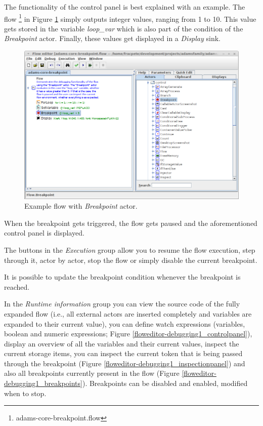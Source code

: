 The functionality of the control panel is best explained with an example. The
flow \footnote{adams-core-breakpoint.flow} in
Figure \ref{floweditor-debugging1_flow} simply outputs integer values, ranging
from 1 to 10. This value gets stored in the variable \textit{loop\_var} which is
also part of the condition of the \textit{Breakpoint} actor. Finally, these
values get displayed in a \textit{Display} sink.
\begin{figure}[htb] 
  \centering
  \includegraphics[width=12.0cm]{images/floweditor-debugging1_flow.png}
  \caption{Example flow with \textit{Breakpoint} actor.}
  \label{floweditor-debugging1_flow}
\end{figure}

When the breakpoint gets triggered, the flow gets paused and the aforementioned
control panel is displayed.
\begin{tight_itemize}
	\item The buttons in the \textit{Execution} group allow you to
	resume the flow execution, step through it, actor by actor,
	stop the flow or simply disable the current breakpoint.
	\item It is possible to update the breakpoint condition whenever the breakpoint
	is reached.
	\item In the \textit{Runtime information} group you can view the source code of
	the fully expanded flow (i.e., all external actors are inserted completely and
	variables are expanded to their current value), you can define watch
	expressions (variables, boolean and numeric expressions; Figure
	\ref{floweditor-debugging1_controlpanel}), display an overview of all the
	variables and their current values, inspect the current storage
	items, you can inspect the current token that is being passed through the
	breakpoint (Figure \ref{floweditor-debugging1_inspectionpanel}) and also
	all breakpoints currently present in the flow (Figure
	\ref{floweditor-debugging1_breakpoints}). Breakpoints can be disabled
	and enabled, modified when to stop.
\end{tight_itemize}

